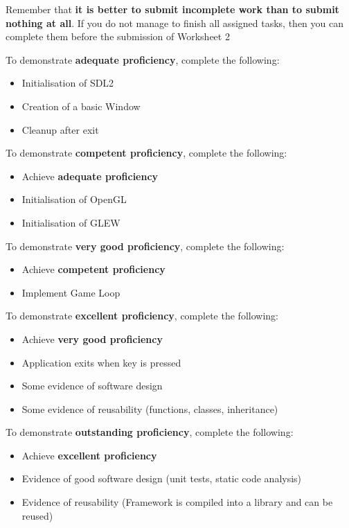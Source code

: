 \documentclass{../../../fal_assignment}
\begin{document}
Remember that \textbf{it is better to submit incomplete work than to submit nothing at all}. If you do not manage to finish all assigned tasks, then you can complete them before the submission of Worksheet 2

To demonstrate \textbf{adequate proficiency}, complete the following:
\begin{itemize}
	\item Initialisation of SDL2
	\item Creation of a basic Window
	\item Cleanup after exit
\end{itemize} 

To demonstrate \textbf{competent proficiency}, complete the following:
\begin{itemize}
	\item Achieve \textbf{adequate proficiency}
	\item Initialisation of OpenGL
	\item Initialisation of GLEW
\end{itemize}

To demonstrate \textbf{very good proficiency}, complete the following:
\begin{itemize}
	\item Achieve \textbf{competent proficiency}
	\item Implement Game Loop
\end{itemize}

To demonstrate \textbf{excellent proficiency}, complete the following:
\begin{itemize}
	\item Achieve \textbf{very good proficiency}
	\item Application exits when key is pressed
	\item Some evidence of software design
	\item Some evidence of reusability (functions, classes, inheritance) 
\end{itemize}

To demonstrate \textbf{outstanding proficiency}, complete the following:
\begin{itemize}
	\item Achieve \textbf{excellent proficiency}
	\item Evidence of good software design (unit tests, static code analysis)
	\item Evidence of reusability (Framework is compiled into a library and can be reused)
\end{itemize}
\end{document}

